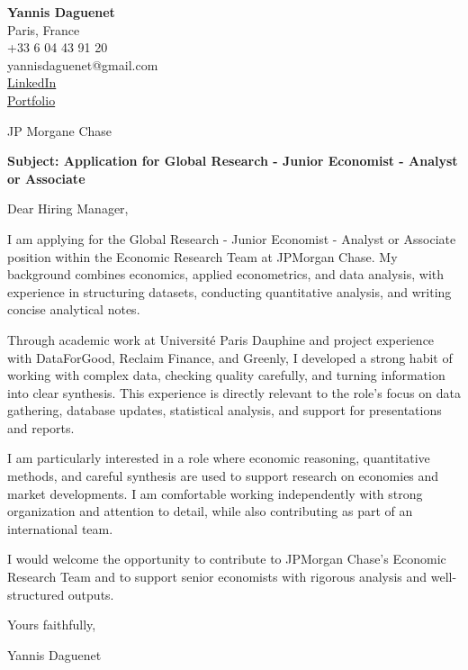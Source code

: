\documentclass[11pt,a4paper]{article}
\begin{document}
\begin{flushleft}
\textbf{Yannis Daguenet}\\
Paris, France\\
+33 6 04 43 91 20\\
yannisdaguenet@gmail.com\\
\href{https://linkedin.com/in/yannis-daguenet}{LinkedIn}\\\href{https://daguenetyannisportfolio.netlify.app/}{Portfolio}\\\end{flushleft}

\vspace{0.25cm}


\vspace{0.15cm}

\begin{flushleft}
JP Morgane Chase\\\end{flushleft}

\vspace{0.20cm}

\textbf{Subject: Application for Global Research - Junior Economist - Analyst or Associate}

\vspace{0.25cm}

Dear Hiring Manager,

\vspace{0.18cm}

I am applying for the Global Research - Junior Economist - Analyst or Associate position within the Economic Research Team at JPMorgan Chase. My background combines economics, applied econometrics, and data analysis, with experience in structuring datasets, conducting quantitative analysis, and writing concise analytical notes.

\vspace{0.18cm}
Through academic work at Université Paris Dauphine and project experience with DataForGood, Reclaim Finance, and Greenly, I developed a strong habit of working with complex data, checking quality carefully, and turning information into clear synthesis. This experience is directly relevant to the role's focus on data gathering, database updates, statistical analysis, and support for presentations and reports.

\vspace{0.18cm}
I am particularly interested in a role where economic reasoning, quantitative methods, and careful synthesis are used to support research on economies and market developments. I am comfortable working independently with strong organization and attention to detail, while also contributing as part of an international team.

\vspace{0.18cm}
I would welcome the opportunity to contribute to JPMorgan Chase's Economic Research Team and to support senior economists with rigorous analysis and well-structured outputs.


\vspace{0.22cm}

Yours faithfully,

\vspace{0.28cm}

Yannis Daguenet
\end{document}
